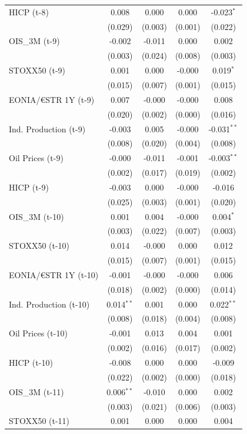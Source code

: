 \begin{longtable}[t]{lcccc}
HICP (t-8) & 0.008 & 0.000 & 0.000 & -0.023$^{*}$\\
 & (0.029) & (0.003) & (0.001) & (0.022)\\
OIS\_3M (t-9) & -0.002 & -0.011 & 0.000 & 0.002\\
 & (0.003) & (0.024) & (0.008) & (0.003)\\
STOXX50 (t-9) & 0.001 & 0.000 & -0.000 & 0.019$^{*}$\\
 & (0.015) & (0.007) & (0.001) & \vphantom{1} (0.015)\\
EONIA/€STR 1Y (t-9) & 0.007 & -0.000 & -0.000 & 0.008\\
 & (0.020) & (0.002) & (0.000) & \vphantom{1} (0.016)\\
Ind. Production (t-9) & -0.003 & 0.005 & -0.000 & -0.031$^{**}$\\
 & (0.008) & (0.020) & (0.004) & (0.008)\\
Oil Prices (t-9) & -0.000 & -0.011 & -0.001 & -0.003$^{**}$\\
 & (0.002) & (0.017) & (0.019) & (0.002)\\
HICP (t-9) & -0.003 & 0.000 & -0.000 & -0.016\\
 & (0.025) & (0.003) & (0.001) & (0.020)\\
OIS\_3M (t-10) & 0.001 & 0.004 & -0.000 & 0.004$^{*}$\\
 & (0.003) & (0.022) & (0.007) & (0.003)\\
STOXX50 (t-10) & 0.014 & -0.000 & 0.000 & 0.012\\
 & (0.015) & (0.007) & (0.001) & (0.015)\\
EONIA/€STR 1Y (t-10) & -0.001 & -0.000 & -0.000 & 0.006\\
 & (0.018) & (0.002) & (0.000) & \vphantom{1} (0.014)\\
Ind. Production (t-10) & 0.014$^{**}$ & 0.001 & 0.000 & 0.022$^{**}$\\
 & (0.008) & (0.018) & (0.004) & (0.008)\\
Oil Prices (t-10) & -0.001 & 0.013 & 0.004 & 0.001\\
 & (0.002) & (0.016) & (0.017) & (0.002)\\
HICP (t-10) & -0.008 & 0.000 & 0.000 & -0.009\\
 & (0.022) & (0.002) & (0.000) & (0.018)\\
OIS\_3M (t-11) & 0.006$^{**}$ & -0.010 & 0.000 & 0.002\\
 & (0.003) & (0.021) & (0.006) & \vphantom{1} (0.003)\\
STOXX50 (t-11) & 0.001 & 0.000 & 0.000 & 0.004\\

\end{longtable}
